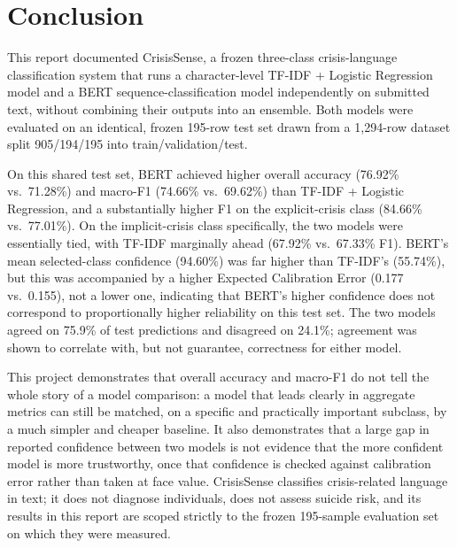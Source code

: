 \chapter{Conclusion}

This report documented CrisisSense, a frozen three-class crisis-language classification system that runs a character-level TF-IDF + Logistic Regression model and a BERT sequence-classification model independently on submitted text, without combining their outputs into an ensemble. Both models were evaluated on an identical, frozen 195-row test set drawn from a 1{,}294-row dataset split 905/194/195 into train/validation/test.

On this shared test set, BERT achieved higher overall accuracy (76.92\% vs.\ 71.28\%) and macro-F1 (74.66\% vs.\ 69.62\%) than TF-IDF + Logistic Regression, and a substantially higher F1 on the explicit-crisis class (84.66\% vs.\ 77.01\%). On the implicit-crisis class specifically, the two models were essentially tied, with TF-IDF marginally ahead (67.92\% vs.\ 67.33\% F1). BERT's mean selected-class confidence (94.60\%) was far higher than TF-IDF's (55.74\%), but this was accompanied by a higher Expected Calibration Error (0.177 vs.\ 0.155), not a lower one, indicating that BERT's higher confidence does not correspond to proportionally higher reliability on this test set. The two models agreed on 75.9\% of test predictions and disagreed on 24.1\%; agreement was shown to correlate with, but not guarantee, correctness for either model.

This project demonstrates that overall accuracy and macro-F1 do not tell the whole story of a model comparison: a model that leads clearly in aggregate metrics can still be matched, on a specific and practically important subclass, by a much simpler and cheaper baseline. It also demonstrates that a large gap in reported confidence between two models is not evidence that the more confident model is more trustworthy, once that confidence is checked against calibration error rather than taken at face value. CrisisSense classifies crisis-related language in text; it does not diagnose individuals, does not assess suicide risk, and its results in this report are scoped strictly to the frozen 195-sample evaluation set on which they were measured.
